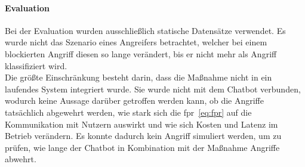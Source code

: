 \paragraph{Evaluation}
Bei der Evaluation wurden ausschließlich statische Datensätze verwendet. Es wurde nicht das Szenario eines Angreifers betrachtet, welcher bei einem blockierten Angriff
diesen so lange verändert, bis er nicht mehr als Angriff klassifiziert wird. \\
Die größte Einschränkung besteht darin, dass die Maßnahme nicht in ein laufendes System integriert wurde. Sie wurde nicht mit dem Chatbot verbunden, wodurch
keine Aussage darüber getroffen werden kann, ob die Angriffe tatsächlich abgewehrt werden, wie stark sich die \ac{fpr}~\eqref{eq:fpr} auf die Kommunikation mit Nutzern 
auswirkt und
wie sich Kosten und Latenz im Betrieb verändern. Es konnte dadurch kein Angriff simuliert werden, um zu prüfen, wie lange der Chatbot in Kombination mit der Maßnahme 
Angriffe abwehrt. 